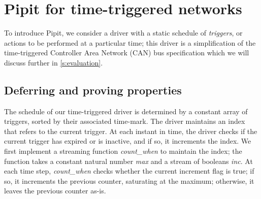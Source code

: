 
\section{Pipit for time-triggered networks}
\label{s:motivation}



To introduce Pipit, we consider a driver with a static schedule of \emph{triggers}, or actions to be performed at a particular time; this driver is a simplification of the time-triggered Controller Area Network (CAN) bus specification \cite{fuehrer2001time} which we will discuss further in \autoref{s:evaluation}.

\subsection{Deferring and proving properties}

The schedule of our time-triggered driver is determined by a constant array of triggers, sorted by their associated time-mark.
The driver maintains an index that refers to the current trigger.
At each instant in time, the driver checks if the current trigger has expired or is inactive, and if so, it increments the index.
We first implement a streaming function \emph{count_when} to maintain the index; the function takes a constant natural number \emph{max} and a stream of booleans \emph{inc}.
At each time step, \emph{count_when} checks whether the current increment flag is true; if so, it increments the previous counter, saturating at the maximum; otherwise, it leaves the previous counter as-is.

